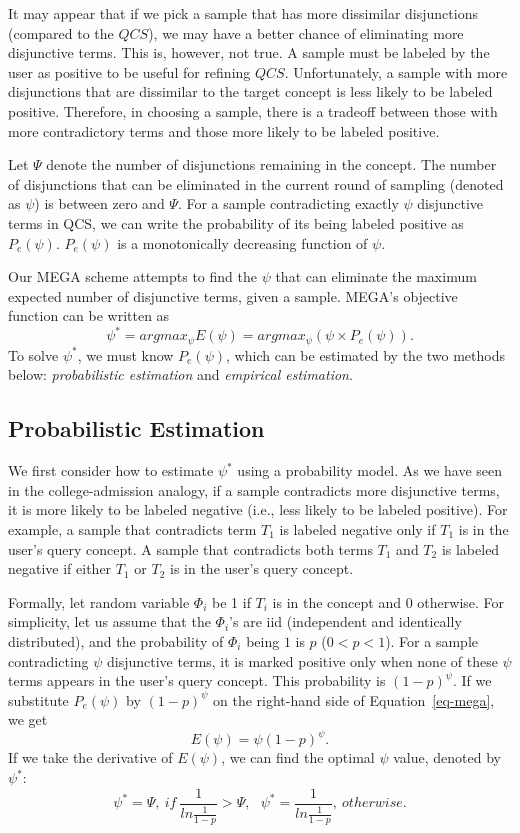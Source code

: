 It may appear that
if we pick a sample that has more dissimilar
disjunctions (compared to the $QCS$), we may have
a better chance of eliminating more disjunctive terms. 
This is, however, not true.
A sample must be labeled by the user as positive to be
useful for refining $QCS$. Unfortunately, a sample with
more disjunctions that are dissimilar
to the target concept is less likely to be
labeled positive.  Therefore, in choosing a sample,
there is a tradeoff between those with more contradictory
terms and those more likely to be labeled positive.

Let $\Psi$ denote the number of disjunctions remaining in the concept.
The number of disjunctions that can be eliminated in the current round 
of sampling (denoted as $\psi$) is between zero and $\Psi$.
For a sample contradicting exactly $\psi$ disjunctive terms in QCS,
we can
write the probability of its being labeled positive as $P_e(\psi)$.
$P_e(\psi)$ is a monotonically decreasing function of $\psi$.

Our MEGA scheme attempts to find the $\psi$ that
can eliminate the maximum expected number
of disjunctive terms, given a sample.
MEGA's objective function can be written as
\begin{equation}
\psi^{*} = argmax_{\psi} E(\psi) = argmax_{\psi} (\psi \times P_e(\psi)).
\label{eq-mega}
\end{equation}
To solve $\psi^{*}$, we must know $P_e(\psi)$, which
can be estimated by the two methods below: {\it probabilistic estimation}
and {\it empirical estimation}.

\subsection{Probabilistic Estimation}

We first consider how to estimate $\psi^*$ using a
probability model.
As we have seen in the college-admission analogy, if a sample contradicts
more disjunctive terms, it is more likely to be labeled negative
(i.e., less likely to be labeled positive).
For example, a sample that contradicts term $T_1$ is
labeled negative only if $T_1$ is in the user's query concept.
A sample that contradicts both terms
$T_1$ and $T_2$ is labeled negative if
either $T_1$ or $T_2$ is in the user's query concept.

Formally, let random variable $\Phi_i$ be 1 if $T_i$ is in
the concept and $0$ otherwise.  For simplicity, let us assume 
that the $\Phi_i$'s are iid (independent and identically distributed),
and the probability of $\Phi_i$ being $1$ is $p$ ($0<p<1$).
For a sample contradicting $\psi$ disjunctive terms, it
is marked positive only when
none of these $\psi$ terms appears in the user's query concept. 
This probability is $(1-p)^\psi$.  
If we substitute $P_e(\psi)$ by $(1-p)^\psi$
on the right-hand side of Equation~\ref{eq-mega}, we get
\[
E(\psi) = \psi(1 - p)^\psi.
\]
If we take the derivative of 
$E(\psi)$, we can find the optimal
$\psi$ value, denoted by $\psi^{*}$:
\[
\psi^{*} = \Psi,~if~\frac{1}{ln \frac{1}{1-p}} > \Psi,~~~
\psi^{*} = \frac{1}{ln \frac{1}{1-p}},~ otherwise.
\]

